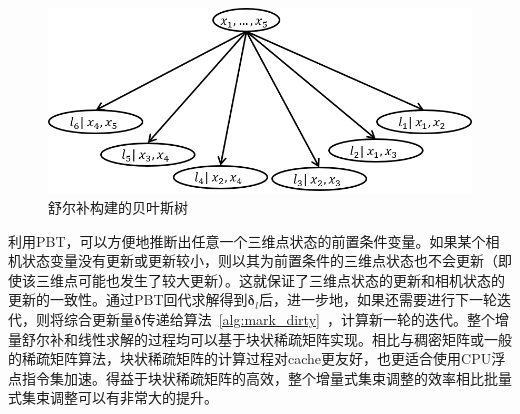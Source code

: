 \begin{figure}[htb!]
    \centering
    \includegraphics[scale=.7]{Pictures/bayes_forest.png}
    \caption{舒尔补构建的贝叶斯树}
    \label{fig:bayes_forest}
\end{figure}

利用PBT，可以方便地推断出任意一个三维点状态的前置条件变量。如果某个相机状态变量没有更新或更新较小，则以其为前置条件的三维点状态也不会更新（即使该三维点可能也发生了较大更新）。这就保证了三维点状态的更新和相机状态的更新的一致性。通过PBT回代求解得到$\bm{\delta}_l$后，进一步地，如果还需要进行下一轮迭代，则将综合更新量$\bm{\delta}$传递给算法~\ref{alg:mark_dirty}~，计算新一轮的迭代。整个增量舒尔补和线性求解的过程均可以基于块状稀疏矩阵实现。相比与稠密矩阵或一般的稀疏矩阵算法，块状稀疏矩阵的计算过程对cache更友好，也更适合使用CPU浮点指令集加速。得益于块状稀疏矩阵的高效，整个增量式集束调整的效率相比批量式集束调整可以有非常大的提升。
